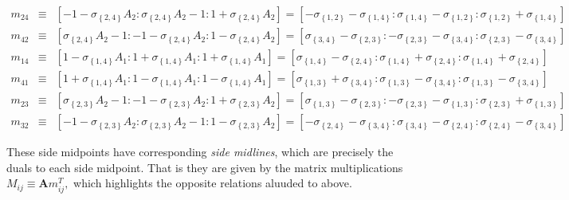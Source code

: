 \documentclass[11pt]{article}
\begin{document}
\begin{eqnarray*}
m_{24} &\equiv &\left[ -1-\sigma _{\left\{ 2,4\right\} }A_{2}:\sigma
_{\left\{ 2,4\right\} }A_{2}-1:1+\sigma _{\left\{ 2,4\right\} }A_{2}\right] =%
\left[ -\sigma _{\left\{ 1,2\right\} }-\sigma _{\left\{ 1,4\right\} }:\sigma
_{\left\{ 1,4\right\} }-\sigma _{\left\{ 1,2\right\} }:\sigma _{\left\{
1,2\right\} }+\sigma _{\left\{ 1,4\right\} }\right] \\
m_{42} &\equiv &\left[ \sigma _{\left\{ 2,4\right\} }A_{2}-1:-1-\sigma
_{\left\{ 2,4\right\} }A_{2}:1-\sigma _{\left\{ 2,4\right\} }A_{2}\right] =%
\left[ \sigma _{\left\{ 3,4\right\} }-\sigma _{\left\{ 2,3\right\} }:-\sigma
_{\left\{ 2,3\right\} }-\sigma _{\left\{ 3,4\right\} }:\sigma _{\left\{
2,3\right\} }-\sigma _{\left\{ 3,4\right\} }\right] \\
m_{14} &\equiv &\left[ 1-\sigma _{\left\{ 1,4\right\} }A_{1}:1+\sigma
_{\left\{ 1,4\right\} }A_{1}:1+\sigma _{\left\{ 1,4\right\} }A_{1}\right] =%
\left[ \sigma _{\left\{ 1,4\right\} }-\sigma _{\left\{ 2,4\right\} }:\sigma
_{\left\{ 1,4\right\} }+\sigma _{\left\{ 2,4\right\} }:\sigma _{\left\{
1,4\right\} }+\sigma _{\left\{ 2,4\right\} }\right] \\
m_{41} &\equiv &\left[ 1+\sigma _{\left\{ 1,4\right\} }A_{1}:1-\sigma
_{\left\{ 1,4\right\} }A_{1}:1-\sigma _{\left\{ 1,4\right\} }A_{1}\right] =%
\left[ \sigma _{\left\{ 1,3\right\} }+\sigma _{\left\{ 3,4\right\} }:\sigma
_{\left\{ 1,3\right\} }-\sigma _{\left\{ 3,4\right\} }:\sigma _{\left\{
1,3\right\} }-\sigma _{\left\{ 3,4\right\} }\right] \\
m_{23} &\equiv &\left[ \sigma _{\left\{ 2,3\right\} }A_{2}-1:-1-\sigma
_{\left\{ 2,3\right\} }A_{2}:1+\sigma _{\left\{ 2,3\right\} }A_{2}\right] =%
\left[ \sigma _{\left\{ 1,3\right\} }-\sigma _{\left\{ 2,3\right\} }:-\sigma
_{\left\{ 2,3\right\} }-\sigma _{\left\{ 1,3\right\} }:\sigma _{\left\{
2,3\right\} }+\sigma _{\left\{ 1,3\right\} }\right] \\
m_{32} &\equiv &\left[ -1-\sigma _{\left\{ 2,3\right\} }A_{2}:\sigma
_{\left\{ 2,3\right\} }A_{2}-1:1-\sigma _{\left\{ 2,3\right\} }A_{2}\right] =%
\left[ -\sigma _{\left\{ 2,4\right\} }-\sigma _{\left\{ 3,4\right\} }:\sigma
_{\left\{ 3,4\right\} }-\sigma _{\left\{ 2,4\right\} }:\sigma _{\left\{
2,4\right\} }-\sigma _{\left\{ 3,4\right\} }\right]
\end{eqnarray*}

These side midpoints have corresponding \textit{side midlines}, which are
precisely the duals to each side midpoint. That is they are given by the
matrix multiplications $M_{ij}\equiv \mathbf{A}m_{ij}^{T},$ which highlights
the opposite relations aluuded to above.
\end{document}
